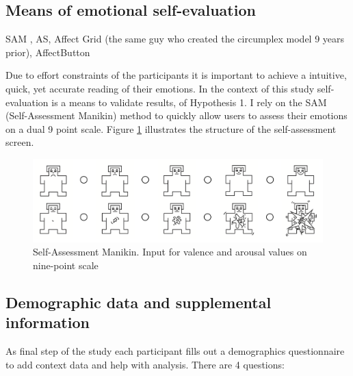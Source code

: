 

	\subsection{Means of emotional self-evaluation} \label{sec:selfeval}
	
	
	
	  \cite{Harley2016}
	
	SAM , AS, Affect Grid \cite{Russell1989} (the same guy who created the circumplex model 9 years prior), AffectButton \cite{Broekens}
	
	Due to effort constraints of the participants it is important to achieve a intuitive, quick, yet accurate reading of their emotions. In the context of this study self-evaluation is a means to validate results, of Hypothesis 1. I rely on the SAM (Self-Assessment Manikin) method \cite{Bradley1994} to quickly allow users to assess their emotions on a dual 9 point scale. Figure \ref{fig:sam} illustrates the structure of the self-assessment screen.
	
\begin{figure}[h]
	\centering
	\includegraphics[width=0.9\linewidth]{graphics/SAM}
	\caption{Self-Assessment Manikin. Input for valence and arousal values on nine-point scale}
	\label{fig:sam}
\end{figure}
	
	\subsection{Demographic data and supplemental information} \label{sec:demographics}
	
	As final step of the study each participant fills out a demographics questionnaire to add context data and help with analysis. There are 4 questions:
	
